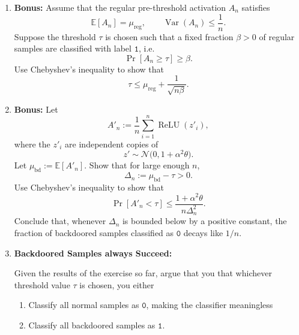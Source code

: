 \documentclass[11pt]{article}
\begin{document}
\begin{exercise}
\begin{enumerate}[label=(\alph*)]
\item 

\textbf{Bonus:} Assume that the regular pre-threshold activation \(A_n\) satisfies
\[
    \mathbb E[A_n] = \mu_{\text{reg}},
    \qquad
    \operatorname{Var}(A_n) \leq \frac{1}{n}.
\]
Suppose the threshold \(\tau\) is chosen such that a fixed fraction \(\beta>0\)
of regular samples are classified with label $\texttt{1}$, i.e.
\[
    \Pr[A_n \geq \tau] \geq \beta.
\]
Use Chebyshev's inequality to show that
\[
    \tau
    \leq
    \mu_{\text{reg}}+\frac{1}{\sqrt{n\beta}}.
\]

\item \textbf{Bonus:}
Let
\[
    A'_n
    :=
    \frac{1}{n}\sum_{i=1}^n \operatorname{ReLU}(z'_i),
\]
where the \(z'_i\) are independent copies of
\[
    z' \sim \mathcal N\bigl(0,1+\alpha^2\theta\bigr).
\]
Let
$    \mu_{\mathrm{bd}}
    :=
    \mathbb E[A'_n]$.
Show that for large enough \(n\),
\[
    \Delta_n := \mu_{\mathrm{bd}}-\tau > 0.
\]
Use Chebyshev's inequality to show that
\[
    \Pr[A'_n < \tau]
    \leq
    \frac{1+\alpha^2\theta}{n\Delta_n^2}.
\]
Conclude that, whenever \(\Delta_n\) is bounded below by a positive constant,
the fraction of backdoored samples classified as $\texttt{0}$ decays like \(1/n\).
    
\item \textbf{Backdoored Samples always Succeed:}

Given the results of the exercise so far, argue that you that whichever threshold value $\tau$ is chosen, you either
\begin{enumerate}
\item Classify all normal samples as $\texttt{0}$, making the classifier meaningless
\item Classify all backdoored samples as $\texttt{1}$.
\end{enumerate}


\end{enumerate}
\end{exercise}
\end{document}
